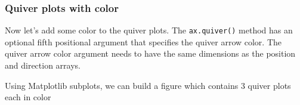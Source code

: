 \documentclass{book}
\begin{document}
    
        \subsubsection{Quiver plots with color}\label{quiver-plots-with-color}

Now let's add some color to the quiver plots. The
\lstinline!ax.quiver()! method has an optional fifth positional argument
that specifies the quiver arrow color. The quiver arrow color argument
needs to have the same dimensions as the position and direction arrays.
    




    
        Using Matplotlib subplots, we can build a figure which contains 3 quiver
plots each in color
    
\end{document}
